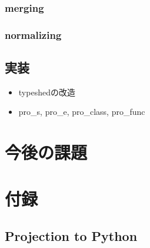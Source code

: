 \documentclass{thesis}
\begin{document}
\subsection{merging}
\subsection{normalizing}

\section{実装}
\begin{itemize}
  \item typeshedの改造
  \item pro\_s, pro\_e, pro\_class, pro\_func
\end{itemize}
\chapter{今後の課題}




\chapter*{付録}
\section*{Projection to Python}
\end{document}
